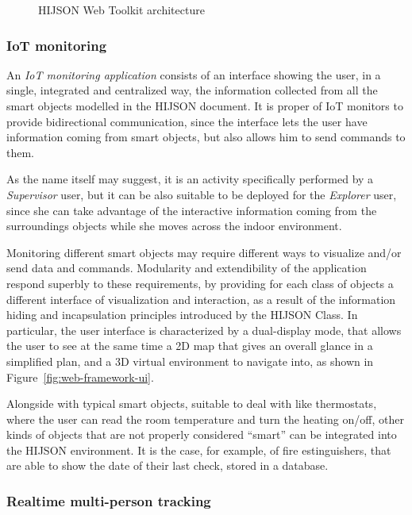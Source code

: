 \begin{figure*}[htb]
\centering
{}
\caption{HIJSON Web Toolkit architecture}
\label{fig:architecture}
\end{figure*}


\subsubsection{IoT monitoring}\label{iot-monitoring}

An \emph{IoT monitoring application} consists of an interface showing the
user, in a single, integrated and centralized way, the information collected
from all the smart objects modelled in the HIJSON document. It is proper of
IoT monitors to provide bidirectional communication, since the interface lets
the user have information coming from smart objects, but also allows him to
send commands to them.

As the name itself may suggest, it is an activity specifically performed by a
\emph{Supervisor} user, but it can be also suitable to be deployed for the
\emph{Explorer} user, since she can take advantage of the interactive
information coming from the surroundings objects while she moves across the
indoor environment.

Monitoring different smart objects may require different ways to visualize
and/or send data and commands. Modularity and extendibility of the application
respond superbly to these requirements, by providing for each class of objects
a different interface of visualization and interaction, as a result of the
information hiding and incapsulation principles introduced by the HIJSON
Class. In particular, the user interface is characterized by a dual-display
mode, that allows the user to see at the same time a 2D map that gives an
overall glance in a simplified plan, and a 3D virtual environment to navigate
into, as shown in Figure~\ref{fig:web-framework-ui}.

Alongside with typical smart objects, suitable to deal with like thermostats,
where the user can read the room  temperature and turn the heating on/off,
other kinds of objects that are not properly considered ``smart'' can be
integrated into the HIJSON environment. It is the case, for example, of fire
estinguishers, that are able to show the date of their last check, stored in a
database.

\subsubsection{Realtime multi-person tracking}\label{realtime-multi-person-tracking}


